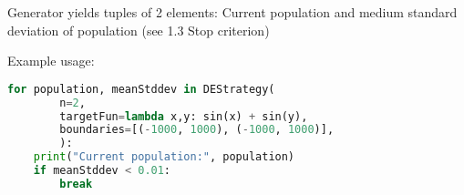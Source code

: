 \documentclass[11pt,a4paper]{article}
\begin{document}
Generator yields tuples of 2 elements:
Current population and medium standard deviation of population (see 1.3 Stop criterion)

Example usage:
\begin{lstlisting}[language=Python]
for population, meanStddev in DEStrategy(
        n=2,
        targetFun=lambda x,y: sin(x) + sin(y),
        boundaries=[(-1000, 1000), (-1000, 1000)],
        ):
    print("Current population:", population)
    if meanStddev < 0.01:
        break
\end{lstlisting}
\end{document}
